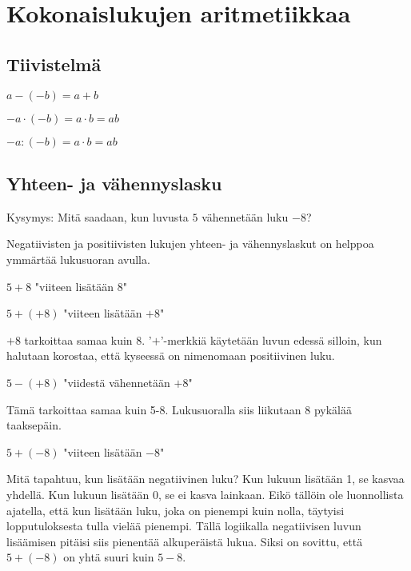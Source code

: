\chapter{Kokonaislukujen aritmetiikkaa}

\section{Tiivistelmä}

$a-(-b)=a+b$

$-a\cdot (-b)=a\cdot b=ab$

$-a:(-b)=a\cdot b=ab$

\section{Yhteen- ja vähennyslasku}

Kysymys: Mitä saadaan, kun luvusta $5$ vähennetään luku $-8$?

Negatiivisten ja positiivisten lukujen yhteen- ja vähennyslaskut on helppoa ymmärtää lukusuoran avulla.


$5+8$ "viiteen lisätään $8$"


$5+(+8)$ "viiteen lisätään $+8$"

$+8$ tarkoittaa samaa kuin $8$. '$+$'-merkkiä käytetään luvun edessä silloin, kun halutaan korostaa, että kyseessä on nimenomaan positiivinen luku.


$5-(+8)$ "viidestä vähennetään $+8$"

Tämä tarkoittaa samaa kuin 5-8. Lukusuoralla siis liikutaan 8 pykälää taaksepäin.


$5+(-8)$ "viiteen lisätään $-8$"

Mitä tapahtuu, kun lisätään negatiivinen luku? Kun lukuun lisätään 1, se kasvaa yhdellä. Kun lukuun lisätään 0, se ei kasva lainkaan. Eikö tällöin ole luonnollista ajatella, että kun lisätään luku, joka on pienempi kuin nolla, täytyisi lopputuloksesta tulla vielää pienempi. Tällä logiikalla negatiivisen luvun lisäämisen pitäisi siis pienentää alkuperäistä lukua. Siksi on sovittu, että $5+(-8)$ on yhtä suuri kuin $5-8$.



